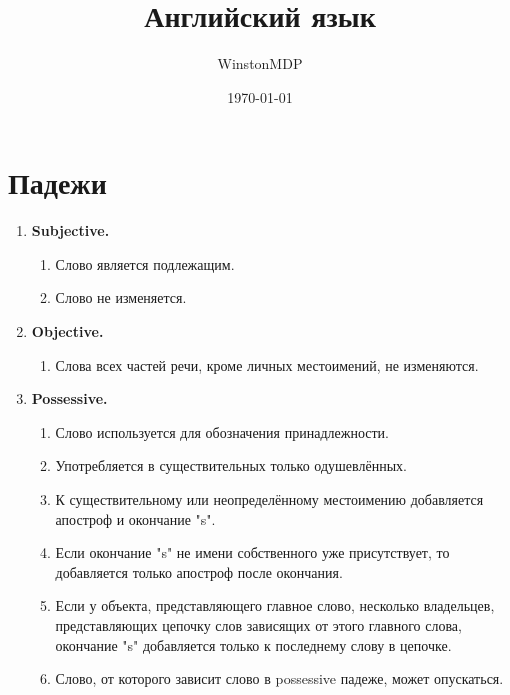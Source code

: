 \documentclass[oneside]{book}
\title{Английский язык}
\date{\today}
\author{WinstonMDP}
\begin{document}
    \maketitle

    \tableofcontents

    \chapter{Падежи}
    \begin{enumerate}
        \item \textbf{Subjective.}
        \begin{enumerate}
            \item Слово является подлежащим.
            \item Слово не изменяется.
        \end{enumerate}

        \item \textbf{Objective.}
        \begin{enumerate}
            \item Слова всех частей речи, кроме личных
            местоимений, не изменяются.
        \end{enumerate}

        \item \textbf{Possessive.}
        \begin{enumerate}
            \item Слово используется для обозначения
            принадлежности.

            \item Употребляется в существительных
            только одушевлённых.

            \item К существительному или неопределённому местоимению добавляется \\
            апостроф и окончание "s".

            \item Если окончание "s"{ }не имени собственного
            уже присутствует, то добавляется
            только апостроф после окончания.

            \item Если у объекта, представляющего
            главное слово, несколько владельцев,
            представляющих цепочку слов зависящих от этого главного слова,
            окончание "s"{ }добавляется
            только к последнему слову в цепочке.

            \item Слово, от которого зависит
            слово в possessive падеже,
            может опускаться.
        \end{enumerate}


\end{enumerate}
\end{document}

